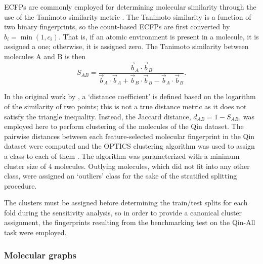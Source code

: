 ECFPs are commonly employed for determining molecular similarity through the use
of the Tanimoto similarity metric
\cite{tanimotoElementaryMathematicalTheory1958,bajuszWhyTanimotoIndex2015,butinaUnsupervisedDataBase1999}.
The Tanimoto similarity is a function of two binary fingerprints, so the
count-based ECFPs are first converted by $b_i = \min (1, c_i)$. That is, if an
atomic environment is present in a molecule, it is assigned a one; otherwise, it
is assigned zero. The Tanimoto similarity between molecules A and B is then
\begin{equation}
    S_{AB} = \frac{\vec{b}_A \cdot \vec{b}_B}{\vec{b}_A \cdot \vec{b}_A + \vec{b}_B \cdot \vec{b}_B - \vec{b}_A \cdot \vec{b}_B}.
\end{equation}

In the original work by \citet{tanimotoElementaryMathematicalTheory1958}, a
`distance coefficient' is defined based on the logarithm of the similarity of
two points; this is not a true distance metric as it does not satisfy the
triangle inequality. Instead, the Jaccard distance, $d_{AB} = 1 - S_{AB}$, was
employed here to perform clustering of the molecules of the Qin dataset. The
pairwise distances between each feature-selected molecular fingerprint in the
Qin dataset were computed and the OPTICS clustering algorithm was used to assign
a class to each of them \cite{ankerstOPTICSOrderingPoints1999}. The algorithm
was parameterized with a minimum cluster size of 4 molecules. Outlying
molecules, which did not fit into any other class, were assigned an `outliers'
class for the sake of the stratified splitting procedure.

The clusters must be assigned before determining the train/test splits for each
fold during the sensitivity analysis, so in order to provide a canonical cluster
assignment, the fingerprints resulting from the benchmarking test on the Qin-All
task were employed.

\subsubsection{Molecular graphs}


